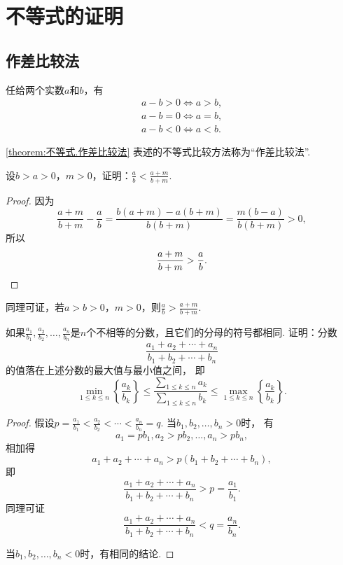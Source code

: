 \section{不等式的证明}
\subsection{作差比较法}
\begin{theorem}\label{theorem:不等式.作差比较法}
任给两个实数\(a\)和\(b\)，有\begin{gather}
	a - b > 0 \iff a > b, \\
	a - b = 0 \iff a = b, \\
	a - b < 0 \iff a < b.
\end{gather}
\end{theorem}
\cref{theorem:不等式.作差比较法} 表述的不等式比较方法称为“作差比较法”.

\begin{example}\label{example:不等式.真分数的分子分母同加一个正数}
设\(b > a > 0\)，\(m > 0\)，证明：\(\frac{a}{b} < \frac{a+m}{b+m}\).
\begin{proof}
因为\[
	\frac{a+m}{b+m} - \frac{a}{b}
	= \frac{b(a+m) - a(b+m)}{b(b+m)}
	= \frac{m(b-a)}{b(b+m)} > 0,
\]
所以\[
	\frac{a+m}{b+m} > \frac{a}{b}.
	\qedhere
\]
\end{proof}
\end{example}
同理可证，若\(a > b > 0\)，\(m > 0\)，则\(\frac{a}{b} > \frac{a+m}{b+m}\).

\begin{example}\label{example:不等式.不同浓度的溶液的混合}
如果\(\frac{a_1}{b_1},\frac{a_2}{b_2},\dotsc,\frac{a_n}{b_n}\)是\(n\)个不相等的分数，且它们的分母的符号都相同.
证明：分数\[
	\frac{a_1+a_2+\dotsb+a_n}{b_1+b_2+\dotsb+b_n}
\]的值落在上述分数的最大值与最小值之间，
即\begin{equation}
	\min_{1 \leq k \leq n}\left\{ \frac{a_k}{b_k} \right\}
	\leq
	\frac{\sum_{1 \leq k \leq n} a_k}{\sum_{1 \leq k \leq n} b_k}
	\leq
	\max_{1 \leq k \leq n}\left\{ \frac{a_k}{b_k} \right\}.
\end{equation}
\begin{proof}
假设\(p=\frac{a_1}{b_1}<\frac{a_2}{b_2}<\dotsb<\frac{a_n}{b_n}=q\).
当\(b_1,b_2,\dotsc,b_n>0\)时，
有\[
	a_1 = p b_1,
	a_2 > p b_2,
	\dotsc,
	a_n > p b_n,
\]
相加得\[
	a_1 + a_2 + \dotsb + a_n > p(b_1 + b_2 + \dotsb + b_n),
\]
即\[
	\frac{a_1+a_2+\dotsb+a_n}{b_1+b_2+\dotsb+b_n} > p = \frac{a_1}{b_1}.
\]
同理可证\[
	\frac{a_1+a_2+\dotsb+a_n}{b_1+b_2+\dotsb+b_n} < q = \frac{a_n}{b_n}.
\]

当\(b_1,b_2,\dotsc,b_n<0\)时，有相同的结论.
\end{proof}
\end{example}


